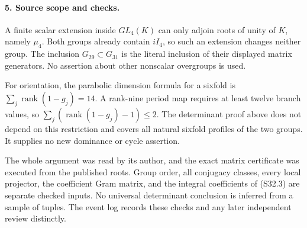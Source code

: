 \paragraph{5. Source scope and checks.}
A finite scalar extension inside \(GL_4(K)\) can only adjoin
roots of unity of \(K\), namely \(\mu_4\). Both groups already
contain \(iI_4\), so such an extension changes neither group.
The inclusion \(G_{29}\subset G_{31}\) is the literal inclusion
of their displayed matrix generators. No assertion about other
nonscalar overgroups is used.

For orientation, the parabolic dimension formula for a sixfold is
\(\sum_j\operatorname{rank}(1-g_j)=14\). A rank-nine period
map requires at least twelve branch values, so
\(\sum_j(\operatorname{rank}(1-g_j)-1)\le2\). The determinant
proof above does not depend on this restriction and covers all
natural sixfold profiles of the two groups. It supplies no new
dominance or cycle assertion.

The whole argument was read by its author, and the exact matrix
certificate was executed from the published roots. Group order,
all conjugacy classes, every local projector, the coefficient Gram
matrix, and the integral coefficients of (S32.3) are separate
checked inputs. No universal determinant conclusion is inferred
from a sample of tuples. The event log records these checks and
any later independent review distinctly.
